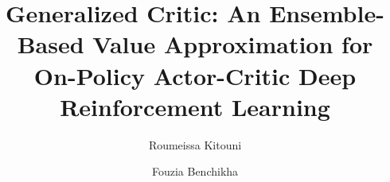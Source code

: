 \documentclass[review]{elsarticle}
\begin{document}
\begin{frontmatter}

\title{Generalized Critic: An Ensemble-Based Value Approximation for On-Policy Actor-Critic Deep Reinforcement Learning}

\author[cne2]{Roumeissa Kitouni}

\author[cne2]{Fouzia Benchikha}




\address[cne2]{LIRE Laboratory, Faculty of New Technologies of Information and Communication, University of Abdelhamid Mehri Constantine 2, Constantine 25016, Algeria}



\end{frontmatter}



%










\end{document}
